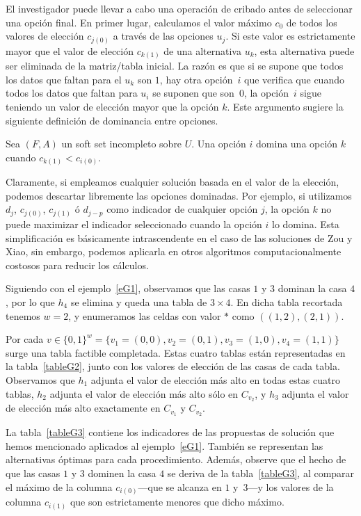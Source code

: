 El investigador puede llevar a cabo una operación de cribado antes de seleccionar una opción final. En primer lugar, calculamos el valor máximo $c_0$ de todos los valores de elección $c_{j(0)}$ a través de las opciones $u_j$. Si este valor es estrictamente mayor que el valor de elección $c_{k(1)}$ de una alternativa $u_k$, esta alternativa puede ser eliminada de la matriz/tabla inicial. La razón es que si se supone que todos los datos que faltan para el $u_k$ son $1$, hay otra opción~$i$ que verifica que cuando todos los datos que faltan para $u_i$ se suponen que son~$0$, la opción~$i$ sigue teniendo un valor de elección mayor que la opción $k$. Este argumento sugiere la siguiente definición de dominancia entre opciones.

\begin{definition}\label{dDom}
Sea $(F,A)$ un soft set incompleto sobre $U$. Una opción $i$ domina una opción $k$ cuando $c_{k(1)} < c_{i(0)}$. 
\end{definition}

Claramente, si empleamos cualquier solución basada en el valor de la elección, podemos descartar libremente las opciones dominadas. Por ejemplo, si utilizamos $d_j$, $c_{j(0)}$, $c_{j(1)}$ ó $d_{j-p}$ como indicador de cualquier opción $j$, la opción $k$ no puede maximizar el indicador seleccionado cuando la opción $i$ lo domina. Esta simplificación es básicamente intrascendente en el caso de las soluciones de Zou y Xiao, sin embargo, podemos aplicarla en otros algoritmos computacionalmente costosos para reducir los cálculos.
\smallskip

Siguiendo con el ejemplo~\ref{eG1}, observamos que las casas $1$ y $3$ dominan la casa $4$, por lo que $h_4$ se elimina y queda una tabla de $3\times 4$. En dicha tabla recortada tenemos $w = 2$, y enumeramos las celdas con valor $*$ como $((1,2),(2,1))$. 

Por cada $v\in  \{0, 1\}^w =  \{v_1=(0,0), v_2=(0,1), v_3=(1,0), v_4=(1,1)\}$ surge una tabla factible completada. Estas cuatro tablas están representadas en la tabla~\ref{tableG2}, junto con los valores de elección de las casas de cada tabla. Observamos que $h_1$ adjunta el valor de elección más alto en todas estas cuatro tablas, $h_2$ adjunta el valor de elección más alto sólo en $C_{v_2}$, y $h_3$ adjunta el valor de elección más alto exactamente en $C_{v_1}$ y $C_{v_2}$. 
\medskip

La tabla~\ref{tableG3} contiene los indicadores de las propuestas de solución que hemos mencionado aplicados al ejemplo~\ref{eG1}. También se representan las alternativas óptimas para cada procedimiento. Además, observe que el hecho de que las casas $1$ y $3$ dominen la casa $4$ se deriva de la tabla~\ref{tableG3}, al comparar el máximo de la columna $c_{i(0)}$---que se alcanza en $1$ y~$3$---y los valores de la columna $c_{i(1)}$ que son estrictamente menores que dicho máximo. 

